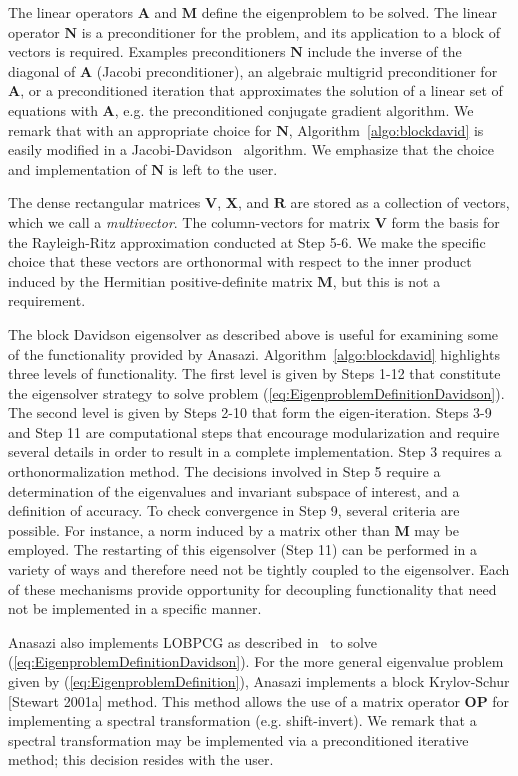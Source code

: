 \documentclass[acmtoms,acmnow]{acmtrans2m}
\begin{document}
The linear operators $\mathbf{A}$ and $\mathbf{M}$ define the
eigenproblem to be solved. The linear operator $\mathbf{N}$ is a
preconditioner for the problem, and its application to a block of
vectors is required. Examples preconditioners $\mathbf{N}$ include
the inverse of the diagonal of $\mathbf{A}$ (Jacobi preconditioner),
an algebraic multigrid preconditioner for $\mathbf{A}$, or a
preconditioned iteration that approximates the solution of a linear
set of equations with $\mathbf{A}$, e.g. the preconditioned
conjugate gradient algorithm. We remark that with an appropriate
choice for $\mathbf{N}$, Algorithm~\ref{algo:blockdavid} is easily
modified in a Jacobi-Davidson~\cite{slvo:96} algorithm. We emphasize that
the choice and implementation of $\mathbf{N}$ is left to the user.

The dense rectangular matrices $\mathbf{V}$, $\mathbf{X}$, and
$\mathbf{R}$ are stored as a collection of vectors, which we call a
\emph{multivector}. 
The column-vectors for matrix $\mathbf{V}$ form
the basis for the Rayleigh-Ritz approximation conducted at Step 5-6.
We make the specific choice that these vectors are orthonormal with
respect to the inner product induced by the Hermitian
positive-definite matrix $\mathbf{M}$, but this is not a requirement.

The block Davidson eigensolver as described above is useful for
examining some of the functionality provided by 
Anasazi. Algorithm~\ref{algo:blockdavid}
highlights three levels of functionality. The first level is given
by Steps 1-12 that constitute the eigensolver strategy to solve
problem (\ref{eq:EigenproblemDefinitionDavidson}). 
The second level is given by Steps 2-10 that form the eigen-iteration.
Steps 3-9 and Step 11 are computational steps that encourage
modularization and require several details in order to result 
in a complete implementation.
Step 3 requires a orthonormalization method. The decisions involved
in Step 5 require a determination of the eigenvalues and invariant
subspace of interest, and a definition of accuracy. To check
convergence in Step 9, several criteria are possible. For instance,
a norm induced by a matrix other than $\mathbf{M}$ may be employed.
The restarting of this eigensolver (Step 11) can be performed in a
variety of ways and therefore need not be tightly coupled to the
eigensolver. Each of these mechanisms provide opportunity for
decoupling functionality that need not be implemented in a specific
manner.

Anasazi also implements LOBPCG as described 
in~\cite{Hetmaniuk:2006:BSL} to solve 
(\ref{eq:EigenproblemDefinitionDavidson}). 
For the more general eigenvalue problem given by
(\ref{eq:EigenproblemDefinition}), Anasazi implements a block
Krylov-Schur [Stewart 2001a] method. This method allows the use of a
matrix operator $\mathbf{OP}$ for implementing a spectral
transformation (e.g. shift-invert). We remark that a spectral
transformation may be implemented via a preconditioned iterative
method; this decision resides with the user.
\end{document}
